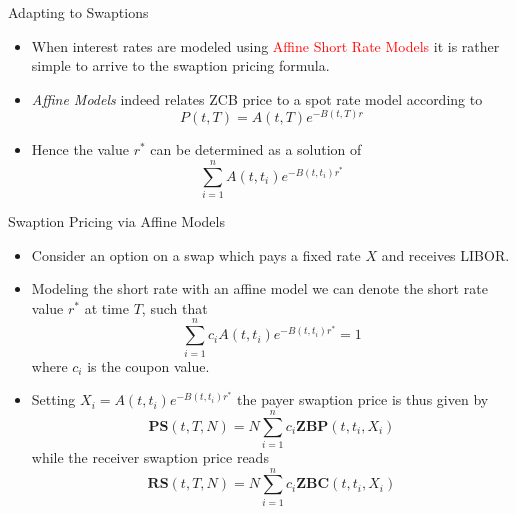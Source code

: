 \documentclass{beamer}
\begin{document}
\begin{frame}{Adapting to Swaptions}
\begin{itemize}
	\item When interest rates are modeled using \textcolor{red}{Affine Short Rate Models} it is rather simple to arrive to the swaption pricing formula.
	\item \emph{Affine Models} indeed relates ZCB price to a spot rate model according to 
	\begin{equation*}
		P(t,T) = A(t,T)e^{-B(t,T)r}
	\end{equation*} 
	\item Hence the value $r^*$ can be determined as a solution of 
	\begin{equation*}
		\sum_{i=1}^n A(t,t_i)e^{-B(t,t_i)r^*}
	\end{equation*}		
\end{itemize}
\end{frame}

\begin{frame}{Swaption Pricing via Affine Models}
\begin{itemize}
	\item Consider an option on a swap which pays a fixed rate $X$ and receives LIBOR.  
	\item Modeling the short rate with an affine model we can denote the short rate value $r^*$ at time $T$, such that
	\begin{equation*}
		\sum_{i=1}^n c_i A(t,t_i)e^{-B(t,t_i)r^*} = 1
	\end{equation*}
	where $c_i$ is the coupon value.
	\item Setting $X_i = A(t,t_i)e^{-B(t,t_i)r^*}$ the payer swaption price is thus given by
	\begin{equation}
		\textbf{PS}(t,T,N) = N\sum_{i=1}^n c_i \textbf{ZBP}(t,t_i,X_i)
	\end{equation}
	while the receiver swaption price reads
	\begin{equation}
		\textbf{RS}(t,T,N) = N\sum_{i=1}^n c_i \textbf{ZBC}(t,t_i,X_i)
	\end{equation}
\end{itemize}
\end{frame}
\end{document}
